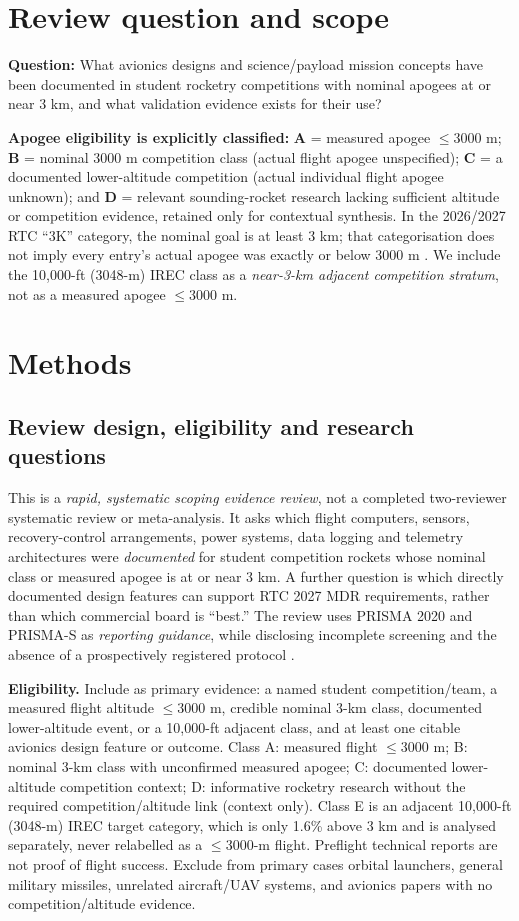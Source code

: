 \documentclass[10pt,a4paper]{article}
\begin{document}
\section{Review question and scope}
\textbf{Question:} What avionics designs and science/payload mission concepts have been documented in student rocketry competitions with nominal apogees at or near 3 km, and what validation evidence exists for their use?

\textbf{Apogee eligibility is explicitly classified:} \textbf{A} = measured apogee $\leq3000$ m; \textbf{B} = nominal 3000 m competition class (actual flight apogee unspecified); \textbf{C} = a documented lower-altitude competition (actual individual flight apogee unknown); and \textbf{D} = relevant sounding-rocket research lacking sufficient altitude or competition evidence, retained only for contextual synthesis. In the 2026/2027 RTC ``3K'' category, the nominal goal is at least 3 km; that categorisation does not imply every entry's actual apogee was exactly or below 3000 m \cite{rtc2027rules}. We include the 10,000-ft (3048-m) IREC class as a \emph{near-3-km adjacent competition stratum}, not as a measured apogee $\le3000$ m.


\section{Methods}
\subsection{Review design, eligibility and research questions}
This is a \emph{rapid, systematic scoping evidence review}, not a completed two-reviewer systematic review or meta-analysis. It asks which flight computers, sensors, recovery-control arrangements, power systems, data logging and telemetry architectures were \emph{documented} for student competition rockets whose nominal class or measured apogee is at or near 3 km. A further question is which directly documented design features can support RTC 2027 MDR requirements, rather than which commercial board is ``best.'' The review uses PRISMA 2020 and PRISMA-S as \emph{reporting guidance}, while disclosing incomplete screening and the absence of a prospectively registered protocol \cite{page2021,rethlefsen2021}.

\textbf{Eligibility.} Include as primary evidence: a named student competition/team, a measured flight altitude $\leq3000$ m, credible nominal 3-km class, documented lower-altitude event, or a 10,000-ft adjacent class, and at least one citable avionics design feature or outcome. Class A: measured flight $\leq3000$ m; B: nominal 3-km class with unconfirmed measured apogee; C: documented lower-altitude competition context; D: informative rocketry research without the required competition/altitude link (context only). Class E is an adjacent 10,000-ft (3048-m) IREC target category, which is only 1.6\% above 3 km and is analysed separately, never relabelled as a $\le3000$-m flight. Preflight technical reports are not proof of flight success. Exclude from primary cases orbital launchers, general military missiles, unrelated aircraft/UAV systems, and avionics papers with no competition/altitude evidence.
\end{document}
